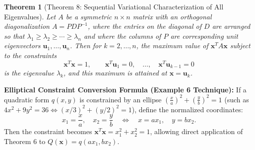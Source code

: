 \documentclass[11pt, letterpaper]{article}
\newtheorem{theorem}{Theorem}[section]
\theoremstyle{definition}
\theoremstyle{remark}
\begin{document}
\begin{theorem}[Theorem 8: Sequential Variational Characterization of All Eigenvalues]
Let $A$ be a symmetric $n \times n$ matrix with an orthogonal diagonalization $A = P D P^{-1}$, where the entries on the diagonal of $D$ are arranged so that $\lambda_1 \ge \lambda_2 \ge \cdots \ge \lambda_n$ and where the columns of $P$ are corresponding unit eigenvectors $\mathbf{u}_1, \dots, \mathbf{u}_n$. Then for $k = 2, \dots, n$, the maximum value of $\mathbf{x}^T A \mathbf{x}$ subject to the constraints
\[
\mathbf{x}^T \mathbf{x} = 1, \qquad \mathbf{x}^T \mathbf{u}_1 = 0, \quad \dots, \quad \mathbf{x}^T \mathbf{u}_{k-1} = 0
\]
is the eigenvalue $\lambda_k$, and this maximum is attained at $\mathbf{x} = \mathbf{u}_k$.
\end{theorem}

\textbf{Elliptical Constraint Conversion Formula (Example 6 Technique):}
If a quadratic form $q(x, y)$ is constrained by an ellipse $\left(\frac{x}{a}\right)^2 + \left(\frac{y}{b}\right)^2 = 1$ (such as $4x^2 + 9y^2 = 36 \iff (x/3)^2 + (y/2)^2 = 1$), define the normalized coordinates:
\[
x_1 = \frac{x}{a}, \quad x_2 = \frac{y}{b} \quad \Longleftrightarrow \quad x = a x_1, \quad y = b x_2.
\]
Then the constraint becomes $\mathbf{x}^T \mathbf{x} = x_1^2 + x_2^2 = 1$, allowing direct application of Theorem 6 to $Q(\mathbf{x}) = q(ax_1, bx_2)$.
\end{document}
